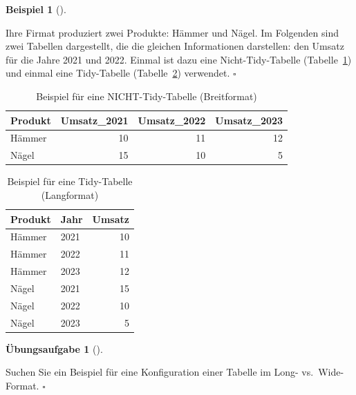 \documentclass[
  letterpaper,
]{scrbook}
\theoremstyle{definition}
\newtheorem{exercise}{Übungsaufgabe}[chapter]
\theoremstyle{definition}
\newtheorem{example}{Beispiel}[chapter]
\theoremstyle{definition}
\theoremstyle{remark}
\begin{document}
\begin{example}[]\protect\hypertarget{exm-widelong}{}\label{exm-widelong}

Ihre Firmat produziert zwei Produkte: Hämmer und Nägel. Im Folgenden
sind zwei Tabellen dargestellt, die die gleichen Informationen
darstellen: den Umsatz für die Jahre 2021 und 2022. Einmal ist dazu eine
Nicht-Tidy-Tabelle (Tabelle~\ref{tbl-untidy1}) und einmal eine
Tidy-Tabelle (Tabelle~\ref{tbl-tidy1}) verwendet. \(\square\)

\end{example}

\begin{longtable}[]{@{}lrrr@{}}

\caption{\label{tbl-untidy1}Beispiel für eine NICHT-Tidy-Tabelle
(Breitformat)}

\tabularnewline

\toprule\noalign{}
Produkt & Umsatz\_2021 & Umsatz\_2022 & Umsatz\_2023 \\
\midrule\noalign{}
\endhead
\bottomrule\noalign{}
\endlastfoot
Hämmer & 10 & 11 & 12 \\
Nägel & 15 & 10 & 5 \\

\end{longtable}

\begin{longtable}[]{@{}llr@{}}

\caption{\label{tbl-tidy1}Beispiel für eine Tidy-Tabelle (Langformat)}

\tabularnewline

\toprule\noalign{}
Produkt & Jahr & Umsatz \\
\midrule\noalign{}
\endhead
\bottomrule\noalign{}
\endlastfoot
Hämmer & 2021 & 10 \\
Hämmer & 2022 & 11 \\
Hämmer & 2023 & 12 \\
Nägel & 2021 & 15 \\
Nägel & 2022 & 10 \\
Nägel & 2023 & 5 \\

\end{longtable}

\begin{exercise}[]\protect\hypertarget{exr-widelong}{}\label{exr-widelong}

Suchen Sie ein Beispiel für eine Konfiguration einer Tabelle im Long-
vs.~Wide-Format. \(\square\)

\end{exercise}
\end{document}
